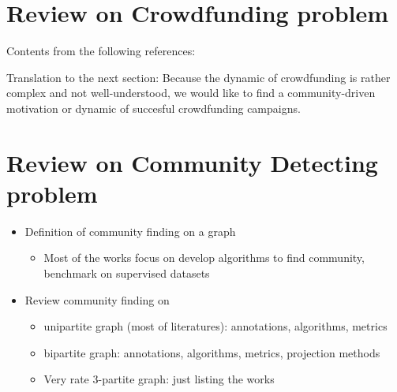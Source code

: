 \section{Review on Crowdfunding problem}

Contents from the following references:

\cite{belleflamme2015}
\cite{mollick2014}
\cite{lindasalahaldin2022}
\cite{salahaldin2019}

Translation to the next section:
Because the dynamic of crowdfunding is rather complex and not well-understood, we would like to find a community-driven motivation or dynamic of succesful crowdfunding campaigns.

\section{Review on Community Detecting problem}

\begin{itemize}
    \item Definition of community finding on a graph
    \begin{itemize}
        \item Most of the works focus on develop algorithms to find community, benchmark on supervised datasets
    \end{itemize}
    \item Review community finding on
    \begin{itemize}
        \item unipartite graph (most of literatures): annotations, algorithms, metrics
        \item bipartite graph: annotations, algorithms, metrics, projection methods
        \item Very rate 3-partite graph: just listing the works
    \end{itemize}
\end{itemize}

\cite{fortunato2010}
\cite{newman2004}